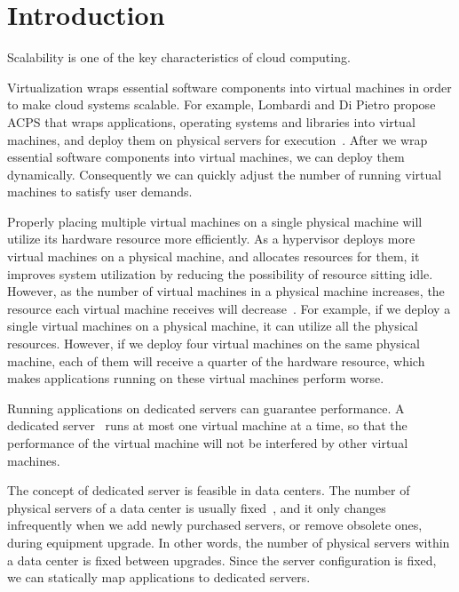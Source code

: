 \chapter{Introduction}

Scalability is one of the key characteristics of cloud computing.

Virtualization wraps essential software components into virtual machines
in order to make cloud systems scalable.  For example, Lombardi and Di
Pietro propose ACPS
that wraps applications, operating systems and libraries into virtual
machines, and deploy them on physical servers for
execution~\cite{secure_virt_for_cloud, cloud_issue}.  After we wrap
essential software components into virtual machines, we can deploy them
dynamically.  Consequently we can quickly adjust the number of running
virtual machines to satisfy user demands.

Properly placing multiple virtual machines on a single physical machine
will utilize its hardware resource more efficiently.  As a hypervisor
deploys more virtual machines on a physical machine, and allocates
resources for them, it improves system utilization by reducing the
possibility of resource sitting idle.  However, as the number of virtual
machines in a physical machine increases, the resource each virtual
machine receives will decrease~\cite{resource_overbooking}.  For
example, if we deploy a single virtual machines on a physical machine,
it can utilize all the physical resources.  However, if we deploy four
virtual machines on the same physical machine, each of them will receive
a quarter of the hardware resource, which makes applications running on
these virtual machines perform worse.

Running applications on dedicated servers can guarantee performance.  A
dedicated server~\cite{dedicated_hosting} runs at most one virtual
machine at a time, so that the performance of the virtual machine will
not be interfered by other virtual machines.

The concept of dedicated server is feasible in data centers.  The
number of physical servers of a data center is usually
fixed~\cite{maintenance_framework}, and it only changes infrequently
when we add newly purchased servers, or remove obsolete ones, during
equipment upgrade.  In other words, the number of physical servers
within a data center is fixed between upgrades.  Since the server
configuration is fixed, we can statically map applications to
dedicated servers.

